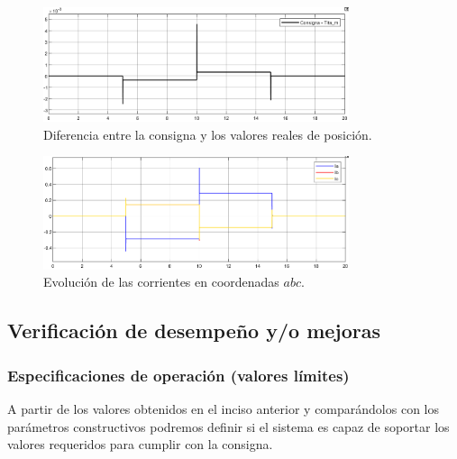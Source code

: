 \documentclass{article}
\begin{document}
\begin{figure}[H]
    \centering
    \includegraphics[width=0.8\textwidth]{5.2.4.b.3.png}
    \caption{Diferencia entre la consigna y los valores reales de posición.}
\end{figure}

\begin{figure}[H]
    \centering
    \includegraphics[width=0.8\textwidth]{5.2.4.b.5.png}
    \caption{Evolución de las corrientes en coordenadas $abc$.}
\end{figure}


\subsection{Verificación de desempeño y/o mejoras}


\subsubsection{Especificaciones de operación (valores límites)}

A partir de los valores obtenidos en el inciso anterior y comparándolos con los parámetros 
constructivos podremos definir si el sistema es capaz de soportar los valores requeridos para cumplir
con la consigna.
\end{document}
